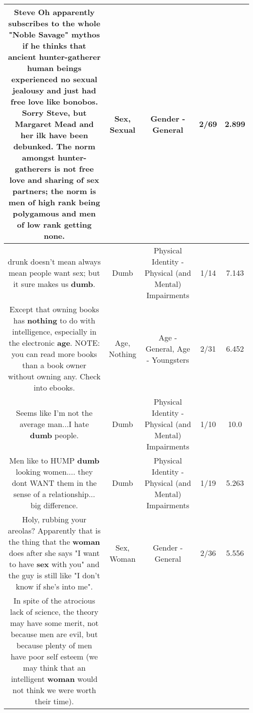 \documentclass[11pt]{article}
\newlength\mylength
\begin{document}
\begin{center}
\begin{longtable}{|C{.65\mylength}|C{.30\mylength}|C{.12\mylength}|C{.12\mylength}|C{.12\mylength}|}
  \small Steve Oh apparently subscribes to the whole "Noble Savage" mythos if he thinks that ancient hunter-gatherer human beings experienced no \textbf{sexual} jealousy and just had free love like bonobos.  Sorry Steve, but Margaret Mead and her ilk have been debunked.  The norm amongst hunter-gatherers is not free love and sharing of \textbf{sex} partners; the norm is men of high rank being polygamous and men of low rank getting none.\normalsize   & Sex, Sexual & Gender - General & 2/69 & 2.899 \\  \hline
  \small drunk doesn't mean always mean people want sex; but it sure makes us \textbf{dumb}.\normalsize   & Dumb & Physical Identity - Physical (and Mental) Impairments & 1/14 & 7.143 \\  \hline
  \small Except that owning books has \textbf{nothing} to do with intelligence, especially in the electronic \textbf{age}. NOTE: you can read more books than a book owner without owning any. Check into ebooks.\normalsize   & Age, Nothing & Age - General, Age - Youngsters & 2/31 & 6.452 \\  \hline
  \small Seems like I'm not the average man...I hate \textbf{dumb} people.\normalsize   & Dumb & Physical Identity - Physical (and Mental) Impairments & 1/10 & 10.0 \\  \hline
  \small Men like to HUMP \textbf{dumb} looking women.... they dont WANT them in the sense of a relationship... big difference.\normalsize   & Dumb & Physical Identity - Physical (and Mental) Impairments & 1/19 & 5.263 \\  \hline
  \small Holy, rubbing your areolas? Apparently that is the thing that the \textbf{woman} does after she says "I want to have \textbf{sex} with you" and the guy is still like "I don't know if she's into me".\normalsize   & Sex, Woman & Gender - General & 2/36 & 5.556 \\  \hline
  \small In spite of the atrocious lack of science, the theory may have some merit, not because men are evil, but because plenty of men have poor self esteem (we may think that an intelligent \textbf{woman} would not think we were worth their time).

\end{longtable}
\end{center}
\end{document}
